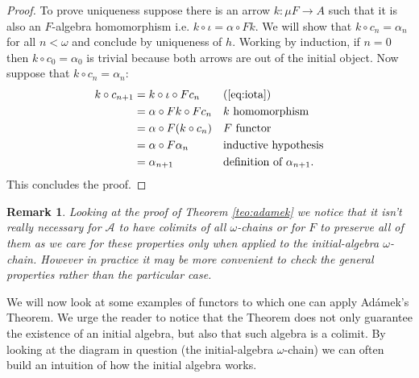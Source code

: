 \documentclass[letterpaper, 11pt, oneside]{memoir}
\theoremstyle{myteo}
\newtheorem{remark}[theorem]{Remark}
\numberwithin{equation}{section}
\newcommand{\A}{\mathscr{A}}
\begin{document}
\begin{proof}
  To prove uniqueness suppose there is an arrow \(k \colon \mu F \to A\) such that it is also an \(F\)-algebra homomorphism i.e. \(k \circ \iota = \alpha \circ Fk\).
  We will show that \(k \circ c_n = \alpha_n\) for all \(n < \omega\) and conclude by uniqueness of \(h\).
  Working by induction, if \(n = 0\) then \(k \circ c_0 = \alpha_0\) is trivial because both arrows are out of the initial object.
  Now suppose that \(k \circ c_n = \alpha_n\):
  \begin{align*}
    k \circ c_{n+1} &= k \circ \iota \circ Fc_n && \text{(\ref{eq:iota})}\\
    &= \alpha \circ Fk \circ Fc_n && \text{\(k\) homomorphism}\\
    &= \alpha \circ F(k \circ c_n) && \text{\(F\) functor}\\
    &= \alpha \circ F\alpha_n && \text{inductive hypothesis}\\
    &= \alpha_{n+1} && \text{definition of \(\alpha_{n+1}\)}.\\
  \end{align*}
  This concludes the proof.
\end{proof}

\begin{remark}
  Looking at the proof of Theorem \ref{teo:adamek} we notice that it isn't really necessary for \(\A\) to have colimits of \emph{all} \(\omega\)-chains or for \(F\) to preserve \emph{all} of them as we care for these properties only when applied to the initial-algebra \(\omega\)-chain.
  However in practice it may be more convenient to check the general properties rather than the particular case.
\end{remark}

We will now look at some examples of functors to which one can apply Adámek's Theorem.
We urge the reader to notice that the Theorem does not only guarantee the existence of an initial algebra, but also that such algebra is a colimit.
By looking at the diagram in question (the initial-algebra \(\omega\)-chain) we can often build an intuition of how the initial algebra works.
\end{document}
